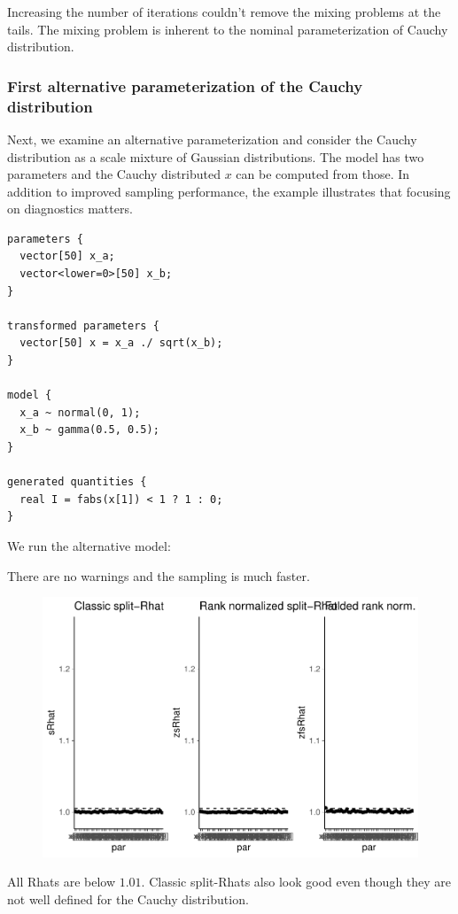\documentclass[american,]{article}
\begin{document}
Increasing the number of iterations couldn't remove the mixing problems
at the tails. The mixing problem is inherent to the nominal
parameterization of Cauchy distribution.

\hypertarget{first-alternative-parameterization-of-the-cauchy-distribution}{%
\subsubsection*{First alternative parameterization of the Cauchy
distribution}\label{first-alternative-parameterization-of-the-cauchy-distribution}}

Next, we examine an alternative parameterization and consider the Cauchy
distribution as a scale mixture of Gaussian distributions. The model has
two parameters and the Cauchy distributed \(x\) can be computed from
those. In addition to improved sampling performance, the example
illustrates that focusing on diagnostics matters.

\begin{verbatim}
parameters {
  vector[50] x_a;
  vector<lower=0>[50] x_b;
}

transformed parameters {
  vector[50] x = x_a ./ sqrt(x_b);
}

model {
  x_a ~ normal(0, 1);
  x_b ~ gamma(0.5, 0.5);
}

generated quantities {
  real I = fabs(x[1]) < 1 ? 1 : 0;
}
\end{verbatim}

We run the alternative model:

There are no warnings and the sampling is much faster.

\begin{figure}[tp]
  \centering
  \includegraphics[width=0.6\linewidth]{graphics/rhat-fit-alt1-1.pdf}
\end{figure}

All Rhats are below \(1.01\). Classic split-Rhats also look good even
though they are not well defined for the Cauchy distribution.
\end{document}
